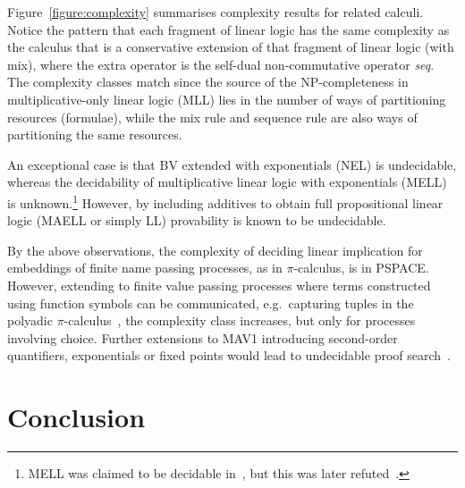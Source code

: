 \documentclass[UKenglish,acmsmall,authorversion]{acmart}
\theoremstyle{plain}
\begin{document}

Figure~\ref{figure:complexity} summarises complexity results for related calculi.
Notice the pattern that each fragment of linear logic has the same complexity as the calculus that is a conservative extension of that fragment of linear logic (with mix), where the extra operator is the self-dual non-commutative operator \textit{seq}. The complexity classes match since the source of the NP-completeness in multiplicative-only linear logic (\textsf{MLL}) lies in the number of ways of partitioning resources (formulae), while the mix rule and sequence rule are also ways of partitioning the same resources.

An exceptional case is that \textsf{BV} extended with exponentials (\textsf{NEL}) is undecidable, whereas the decidability of multiplicative linear logic with exponentials (\textsf{MELL}) is unknown.\footnote{\textsf{MELL} was claimed to be decidable in~\cite{Bimbo2015}, but this was later refuted~\cite{Strassburger19}. } 
However, by including additives to obtain full propositional linear logic (\textsf{MAELL} or simply \textsf{LL}) provability is known to be undecidable.

By the above observations, the complexity of deciding linear implication for embeddings of finite name passing processes, as in $\pi$-calculus, is in PSPACE.
However, extending to finite value passing processes where terms constructed using function symbols can be communicated, e.g.\ capturing tuples in the polyadic $\pi$-calculus~\cite{Milner1993}, the complexity class increases, but only for processes involving choice.
Further extensions to \textsf{MAV1}
introducing second-order quantifiers, exponentials or fixed points would lead to undecidable proof search~\cite{Lafont1996,Lincoln1995,Strassburger2003}.

\section{Conclusion}
\end{document}
